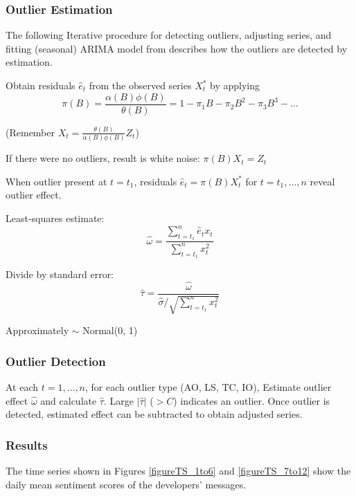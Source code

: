 \documentclass[12pt,letterpaper]{gthesis2}  %
\begin{document}
\subsubsection{Outlier Estimation} 

The following Iterative procedure for detecting outliers, adjusting series,
and fitting (seasonal) ARIMA model from \cite{Chen} describes how the outliers are detected by estimation. 

Obtain residuals $\hat{e}_t$ from the observed series $X^*_t$ by applying
\begin{equation*}
\pi(B) = \frac{\alpha(B) \phi(B)}{\theta(B)} = 1 - \pi_1B - \pi_2B^2 - \pi_3B^3 - ...
\end{equation*}

(Remember $X_t = \frac{\theta(B)}{\alpha(B) \phi(B)} Z_t$)

If there were no outliers, result is white noise: $\pi(B) X_t = Z_t$

When outlier present at $t = t_1$, residuals $\hat{e}_t = \pi(B) X^*_t$ for $t = t_1, \dots, n$ reveal outlier effect.

Least-squares estimate:
\begin{equation*}
\hat{\omega} = \frac{\sum_{t = t_1}^{n} \hat{e}_t x_{t}}{\sum_{t = t_1}^{n} x^2_{t}}
\end{equation*}

Divide by standard error:
\begin{equation*}
\hat{\tau} = \frac{\hat{\omega}}{\hat{\sigma} / \sqrt{\sum_{t = t_1}^{n} x^2_t}}
\end{equation*}

Approximately $\sim$ Normal(0, 1)

\subsubsection{Outlier Detection}

At each $t = 1, \dots, n$, for each outlier type (AO, LS, TC, IO), Estimate outlier effect $\hat{\omega}$ and calculate $\hat{\tau}$. Large $|\hat{\tau}|$ ($> C$) indicates an outlier. Once outlier is detected, estimated effect can be subtracted to obtain adjusted series.\cite{Chen}

\subsubsection{Results}

The time series shown in Figures \ref{figureTS_1to6} and \ref{figureTS_7to12} show the daily mean sentiment scores of the developers' messages.
\end{document}
